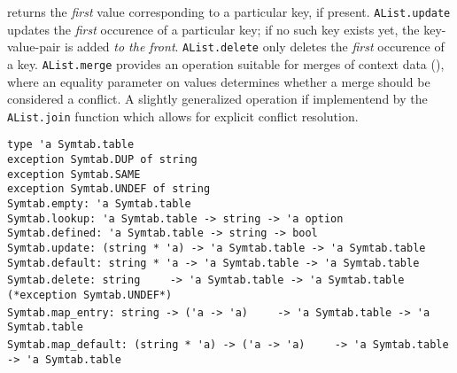 \begin{isabellebody}
\begin{isamarkuptext}
  returns the \emph{first} value corresponding to a particular
  key, if present.  \verb|AList.update| updates
  the \emph{first} occurence of a particular key; if no such
  key exists yet, the key-value-pair is added \emph{to the front}.
  \verb|AList.delete| only deletes the \emph{first} occurence of a key.
  \verb|AList.merge| provides an operation suitable for merges of context data
  (), where an equality parameter on
  values determines whether a merge should be considered a conflict.
  A slightly generalized operation if implementend by the \verb|AList.join|
  function which allows for explicit conflict resolution.%
\end{isamarkuptext}%
\isamarkuptrue%
%
\isamarkuptrue%
%
\begin{isamarkuptext}%
\begin{mldecls}
  \verb|type 'a Symtab.table| \\
  \verb|exception Symtab.DUP of string| \\
  \verb|exception Symtab.SAME| \\
  \verb|exception Symtab.UNDEF of string| \\
  \verb|Symtab.empty: 'a Symtab.table| \\
  \verb|Symtab.lookup: 'a Symtab.table -> string -> 'a option| \\
  \verb|Symtab.defined: 'a Symtab.table -> string -> bool| \\
  \verb|Symtab.update: (string * 'a) -> 'a Symtab.table -> 'a Symtab.table| \\
  \verb|Symtab.default: string * 'a -> 'a Symtab.table -> 'a Symtab.table| \\
  \verb|Symtab.delete: string|\isasep\isanewline%
\verb|    -> 'a Symtab.table -> 'a Symtab.table (*exception Symtab.UNDEF*)| \\
  \verb|Symtab.map_entry: string -> ('a -> 'a)|\isasep\isanewline%
\verb|    -> 'a Symtab.table -> 'a Symtab.table| \\
  \verb|Symtab.map_default: (string * 'a) -> ('a -> 'a)|\isasep\isanewline%
\verb|    -> 'a Symtab.table -> 'a Symtab.table| \\

\end{mldecls}
\end{isamarkuptext}
\end{isabellebody}
